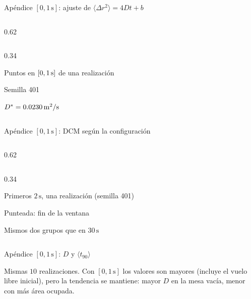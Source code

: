 \documentclass[aspectratio=169,10pt]{beamer}
\begin{document}
\begin{frame}[noframenumbering]{Apéndice $[0, 1\,\mathrm{s}]$: ajuste de $\langle \Delta r^{2}\rangle = 4Dt + b$}
  \begin{cols}
    \begin{column}{0.62\textwidth}
    \end{column}
    \begin{column}{0.34\textwidth}
      \begin{parametros}
        \item Puntos en $[0, 1\,\mathrm{s}]$ de una realización
        \item Semilla 401
      \end{parametros}
      \begin{resultado}
        \item $D^{*} = 0.0230\,\mathrm{m}^{2}/\mathrm{s}$
      \end{resultado}
    \end{column}
  \end{cols}
\end{frame}

\begin{frame}[noframenumbering]{Apéndice $[0, 1\,\mathrm{s}]$: DCM según la configuración}
  \begin{cols}
    \begin{column}{0.62\textwidth}
    \end{column}
    \begin{column}{0.34\textwidth}
      \begin{parametros}
        \item Primeros $2\,\mathrm{s}$, una realización (semilla 401)
        \item Punteada: fin de la ventana
      \end{parametros}
      \begin{resultado}
        \item Mismos dos grupos que en $30\,\mathrm{s}$
      \end{resultado}
    \end{column}
  \end{cols}
\end{frame}

\begin{frame}[noframenumbering]{Apéndice $[0, 1\,\mathrm{s}]$: $D$ y $\langle t_{90}\rangle$}
  \centering\small
  \renewcommand{\arraystretch}{1.3}
  
  \par\vspace{8pt}
  {\footnotesize Mismas $10$ realizaciones. Con $[0, 1\,\mathrm{s}]$ los valores son mayores (incluye el vuelo libre inicial),
  pero la tendencia se mantiene: mayor $D$ en la mesa vacía, menor con más área ocupada.}
\end{frame}
\end{document}
